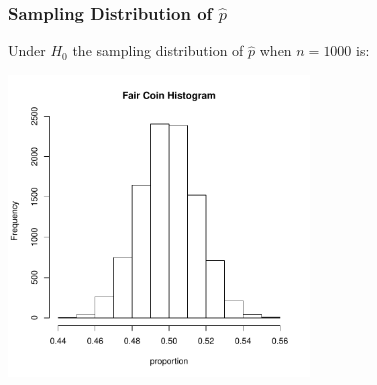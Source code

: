 \documentclass[handout]{beamer}
\newcommand{\blue}[1]{\textcolor{blue2}{#1}}
\begin{document}
%
%
%
%
\begin{frame}
\frametitle{Sampling Distribution of $\widehat{p}$}
\blue{Under $H_0$} the sampling distribution of $\widehat{p}$ when $n=1000$ is:

\begin{center}
\includegraphics[width=0.6\textwidth]{figure/hist1}
\end{center}
\end{frame}
\end{document}
